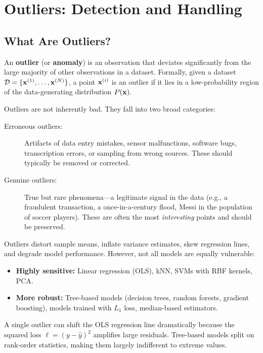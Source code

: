 \chapter*{Outliers: Detection and Handling}

\section*{What Are Outliers?}

\begin{definition}[Outlier]
An \textbf{outlier} (or \textbf{anomaly}) is an observation that deviates significantly from the large majority of other observations in a dataset. Formally, given a dataset $\mathcal{D} = \{\mathbf{x}^{(1)}, \dots, \mathbf{x}^{(N)}\}$, a point $\mathbf{x}^{(i)}$ is an outlier if it lies in a low-probability region of the data-generating distribution $P(\mathbf{x})$.
\end{definition}

Outliers are not inherently bad. They fall into two broad categories:

\begin{description}
    \item[Erroneous outliers:] Artifacts of data entry mistakes, sensor malfunctions, software bugs, transcription errors, or sampling from wrong sources. These should typically be removed or corrected.
    \item[Genuine outliers:] True but rare phenomena---a legitimate signal in the data (e.g., a fraudulent transaction, a once-in-a-century flood, Messi in the population of soccer players). These are often the most \textit{interesting} points and should be preserved.
\end{description}

\begin{remark}
Outliers distort sample means, inflate variance estimates, skew regression lines, and degrade model performance. However, not all models are equally vulnerable:
\begin{itemize}
    \item \textbf{Highly sensitive:} Linear regression (OLS), kNN, SVMs with RBF kernels, PCA.
    \item \textbf{More robust:} Tree-based models (decision trees, random forests, gradient boosting), models trained with $L_1$ loss, median-based estimators.
\end{itemize}
A single outlier can shift the OLS regression line dramatically because the squared loss $\ell = (y - \hat{y})^2$ amplifies large residuals. Tree-based models split on rank-order statistics, making them largely indifferent to extreme values.
\end{remark}


